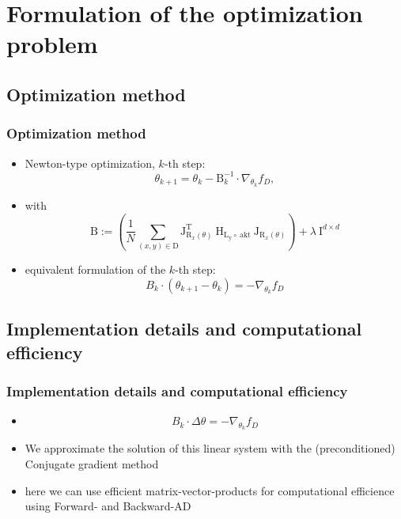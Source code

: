 




\beamertemplatenavigationsymbolsempty{}


\section{Formulation of the optimization problem}

  \subsection{Optimization method}
  \begin{frame}
  \frametitle{Optimization method}
  \begin{itemize}
  	\item Newton-type optimization, $k$-th step: 
  	$$\theta_{k+1} = \theta_{k} - \mathrm{B}_{k}^{-1}\cdot\nabla_{\theta_{k}} f_{D},$$%
  	\pause
  	\item[] with
  	$$\mathrm{B} := \left(\frac{1}{N}\sum_{(x, y)\in\mathrm{D}}^{}\mathrm{J}_{\mathrm{R}_{x}(\theta)}^{\mathrm{T}}\:\mathrm{H}_{\mathrm{L_{y}\circ\:\text{akt}}}\:\mathrm{J}_{\mathrm{R}_{x}(\theta)}\right) + \lambda\:\mathrm{I}^{d\times d} $$
  	\item equivalent formulation of the $k$-th step:
  	$$B_{k}\cdot (\theta_{k+1} - \theta_{k}) = -\nabla_{\theta_{k}}f_{D}$$
  \end{itemize}
\end{frame}

\subsection{Implementation details and computational efficiency}
\begin{frame}
\frametitle{Implementation details and computational efficiency}
\begin{itemize}
	\item[] $$B_{k}\cdot \Delta\theta = -\nabla_{\theta_{k}}f_{D}$$
	\item We approximate the solution of this linear system with the (preconditioned) Conjugate gradient method
	\pause
	\item here we can use efficient matrix-vector-products for computational efficience using Forward- and Backward-AD
\end{itemize}
\end{frame}
  
